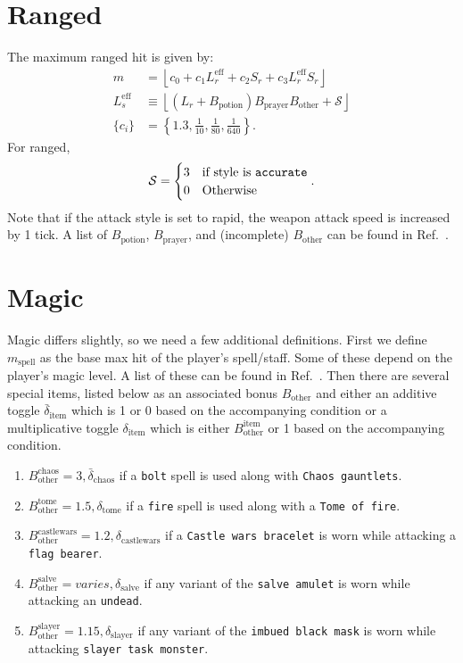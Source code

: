 \section{Ranged}
	The maximum ranged hit is given by:
	\begin{align}
		m &= \left \lfloor c_0 + c_1 L^\text{eff}_{r} + c_2 S_r + c_3 L^\text{eff}_{r} S_r \right \rfloor\\
		 L^\text{eff}_{s} &\equiv \left \lfloor (L_r + B_\text{potion})B_\text{prayer}B_\text{other} + \mathcal{S} \right \rfloor\\
		 \{c_i\} &= \left \{1.3, \frac{1}{10}, \frac{1}{80}, \frac{1}{640} \right \}.
	\end{align}
	For ranged,
	\begin{align}
		\mathcal{S} = \begin{cases}
			3 & \text{if style is \texttt{accurate}} \\
			0 & \text{Otherwise}
		\end{cases}.
	\end{align}
	Note that if the attack style is set to rapid, the weapon attack speed is increased by 1 tick.
	A list of $B_\text{potion}$, $B_\text{prayer}$, and (incomplete) $B_\text{other}$ can be found in Ref.~\cite{wiki:max_ranged}.

\section{Magic}
	Magic differs slightly, so we need a few additional definitions.
	First we define $m_\text{spell}$ as the base max hit of the player's spell/staff. Some of these depend on the player's magic level. A list of these can be found in Ref.~\cite{wiki:max_magic}.
	Then there are several special items, listed below as an associated bonus $B_\text{other}$ and either an additive toggle $\bar \delta_\text{item}$ which is 1 or 0 based on the accompanying condition or a multiplicative toggle $\delta_\text{item}$ which is either $B_\text{other}^\text{item}$ or 1 based on the accompanying condition.
	\begin{enumerate}
		\item $B_\text{other}^\text{chaos}=3, \bar\delta_\text{chaos}$ if a \texttt{bolt} spell is used along with \texttt{Chaos gauntlets}.
		\item $B_\text{other}^\text{tome}=1.5, \delta_\text{tome}$ if a \texttt{fire} spell is used along with a \texttt{Tome of fire}.
		\item $B_\text{other}^\text{castlewars}=1.2, \delta_\text{castlewars}$ if a \texttt{Castle wars bracelet} is worn while attacking a \texttt{flag bearer}.
		\item $B_\text{other}^\text{salve}=\textit{varies}, \delta_\text{salve}$ if any variant of the \texttt{salve amulet} is worn while attacking an \texttt{undead}.
		\item $B_\text{other}^\text{slayer}=1.15, \delta_\text{slayer}$ if any variant of the \texttt{imbued black mask} is worn while attacking \texttt{slayer task monster}.
	\end{enumerate}

